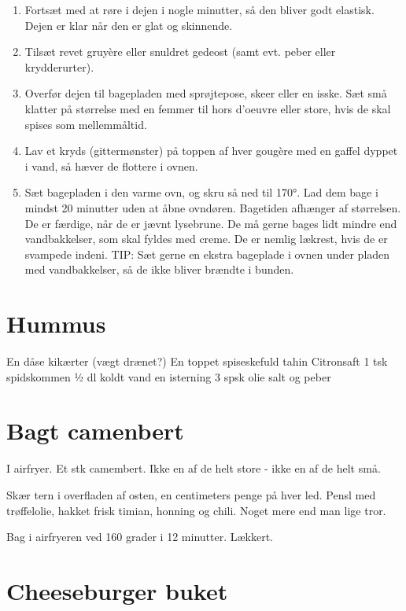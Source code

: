 \documentclass[
]{book}
\providecommand{\tightlist}{%
  \setlength{\itemsep}{0pt}\setlength{\parskip}{0pt}}
\begin{document}
\begin{enumerate}
\def\labelenumi{\arabic{enumi}.}
\setcounter{enumi}{6}
\tightlist
\item
  Fortsæt med at røre i dejen i nogle minutter, så den bliver godt elastisk. Dejen er klar når den er glat
  og skinnende.
\item
  Tilsæt revet gruyère eller snuldret gedeost (samt evt. peber eller krydderurter).
\item
  Overfør dejen til bagepladen med sprøjtepose, skeer eller en isske. Sæt små klatter på størrelse med
  en femmer til hors d'oeuvre eller store, hvis de skal spises som mellemmåltid.
\item
  Lav et kryds (gittermønster) på toppen af hver gougère med en gaffel dyppet i vand, så hæver de
  flottere i ovnen.
\item
  Sæt bagepladen i den varme ovn, og skru så ned til 170°. Lad dem bage i mindst 20 minutter uden at
  åbne ovndøren. Bagetiden afhænger af størrelsen. De er færdige, når de er jævnt lysebrune. De må
  gerne bages lidt mindre end vandbakkelser, som skal fyldes med creme. De er nemlig lækrest, hvis de er
  svampede indeni.
  TIP: Sæt gerne en ekstra bageplade i ovnen under pladen med vandbakkelser, så de ikke bliver brændte
  i bunden.
\end{enumerate}

\hypertarget{hummus}{%
\section{Hummus}\label{hummus}}

En dåse kikærter (vægt drænet?)
En toppet spiseskefuld tahin
Citronsaft
1 tsk spidskommen
½ dl koldt vand
en isterning
3 spsk olie
salt og peber

\hypertarget{bagt-camenbert}{%
\section{Bagt camenbert}\label{bagt-camenbert}}

I airfryer. Et stk camembert. Ikke en af de helt store - ikke en af de helt små.

Skær tern i overfladen af osten, en centimeters penge på hver led.
Pensl med trøffelolie, hakket frisk timian, honning og chili. Noget mere end man
lige tror.

Bag i airfryeren ved 160 grader i 12 minutter. Lækkert.

\hypertarget{cheeseburger-buket}{%
\section{Cheeseburger buket}\label{cheeseburger-buket}}
\end{document}
